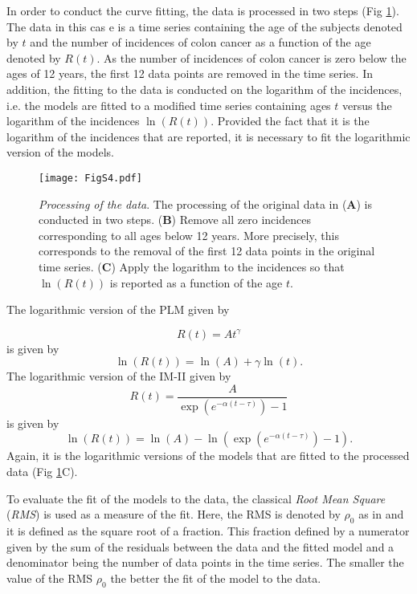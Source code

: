 In order to conduct the curve fitting, the data is processed in two steps (Fig \ref{fig:data_processing}). The data in this cas e is a time series containing the age of the subjects denoted by $t$ and the number of incidences of colon cancer as a function of the age denoted by $R(t)$. As the number of incidences of colon cancer is zero below the ages of 12 years, the first 12 data points are removed in the time series. In addition, the fitting to the data is conducted on the logarithm of the incidences, i.e. the models are fitted to a modified time series containing ages $t$ versus the logarithm of the incidences $\ln\left(R(t)\right)$. Provided the fact that it is the logarithm of the incidences that are reported, it is necessary to fit the logarithmic version of the models. 


\begin{figure}[htbp!]
  \texttt{[image: FigS4.pdf]}
  \caption[Processing of the data]{\textit{Processing of the data}. The processing of the original data in (\textbf{A}) is conducted in two steps. (\textbf{B}) Remove all zero incidences corresponding to all ages below 12 years. More precisely, this corresponds to the removal of the first 12 data points in the original time series. (\textbf{C}) Apply the logarithm to the incidences so that $\ln\left(R(t)\right)$ is reported as a function of the age $t$.}
  \label{fig:data_processing}
  \end{figure}

  The logarithmic version of the PLM given by

  $$R(t)=At^{\gamma}$$
  is given by
  $$\ln\left(R(t)\right)=\ln(A)+\gamma\ln(t).$$
  The logarithmic version of the IM-II given by
  $$R(t)=\dfrac{A}{\exp\left(e^{-\alpha(t-\tau)}\right)-1}$$
  is given by
  $$\ln\left(R(t)\right)=\ln(A)-\ln\left(\exp\left(e^{-\alpha(t-\tau)}\right)-1\right).$$
  Again, it is the logarithmic versions of the models that are fitted to the processed data (Fig \ref{fig:data_processing}C).

  To evaluate the fit of the models to the data, the classical \textit{Root Mean Square} (\textit{RMS}) is used as a measure of the fit. Here, the RMS is denoted by $\rho_0$ as in \cite{ohlsson2020symmetry} and it is defined as the square root of a fraction. This fraction defined by a numerator given by the sum of the residuals between the data and the fitted model and a denominator being the number of data points in the time series. The smaller the value of the RMS $\rho_0$ the better the fit of the model to the data. 
  

  